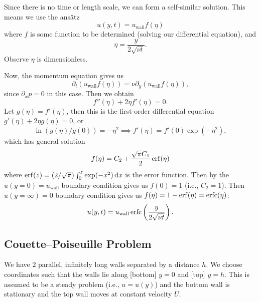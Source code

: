 \begin{node}
Since there is no time or length scale, we can form a self-similar
solution. This means we use the ans\"{a}tz
\begin{equation}
u(y,t)=u_{\text{wall}}f(\eta)
\end{equation}
where $f$ is some function to be determined (solving our differential
equation), and
\begin{equation}
\eta=\frac{y}{2\sqrt{\nu t}}.
\end{equation}
Observe $\eta$ is dimensionless.

Now, the momentum equation gives us
\begin{equation}
\partial_{t}(u_{\text{wall}}f(\eta))=\nu\partial_{y}(u_{\text{wall}}f(\eta)),
\end{equation}
since $\partial_{x}p=0$ in this case. Then we obtain
\begin{equation}
f''(\eta)+2\eta f'(\eta)=0.
\end{equation}
Let $g(\eta)=f'(\eta)$, then this is the first-order differential
equation $g'(\eta)+2\eta g(\eta)=0$, or
\begin{equation}
\ln(g(\eta)/g(0))=-\eta^{2}\implies f'(\eta)=f'(0)\exp(-\eta^{2}),
\end{equation}
which has general solution
\begin{equation}
f(\eta)=C_{2}+\frac{\sqrt{\pi}C_{1}}{2}\operatorname{erf}(\eta)
\end{equation}
where $\operatorname{erf}(z)=(2/\sqrt{\pi})\int^{z}_{0}\exp(-x^{2})\,\mathrm{d} x$ is the
error function.
Then by the $u(y=0)=u_{\text{wall}}$ boundary condition gives us
$f(0)=1$ (i.e., $C_{2}=1$). Then $u(y=\infty)=0$ boundary condition
gives us $f(\eta)=1-\operatorname{erf}(\eta)=\operatorname{erfc}(\eta)$:
\begin{equation}
u(y,t)=u_{\text{wall}}\operatorname{erfc}\left(\frac{y}{2\sqrt{\nu t}}\right).
\end{equation}
\end{node}

\subsection{Couette--Poiseuille Problem}

\begin{problem}
We have 2 parallel, infinitely long walls separated by a distance $h$.
We choose coordinates such that the walls lie along [bottom] $y=0$ and
[top] $y=h$. This is assumed to be a steady problem (i.e., $u=u(y)$)
and the bottom wall is stationary and the top wall moves at constant
velocity $U$.
\end{problem}

